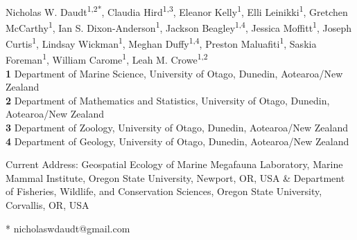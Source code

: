 \documentclass[10pt,letterpaper]{article}
\begin{document}
\vspace*{0.2in}

\begin{flushleft}
{\Large
\textbf{}
}
\newline
\\
Nicholas W. Daudt\textsuperscript{1,2*},
Claudia Hird\textsuperscript{1,3},
Eleanor Kelly\textsuperscript{1},
Elli Leinikki\textsuperscript{1},
Gretchen McCarthy\textsuperscript{1},
Ian S. Dixon-Anderson\textsuperscript{1},
Jackson Beagley\textsuperscript{1,4},
Jessica Moffitt\textsuperscript{1},
Joseph Curtis\textsuperscript{1},
Lindsay Wickman\textsuperscript{1\textcurrency},
Meghan Duffy\textsuperscript{1,4},
Preston Maluafiti\textsuperscript{1},
Saskia Foreman\textsuperscript{1},
William Carome\textsuperscript{1},
Leah M. Crowe\textsuperscript{1,2}
\\
\bigskip
\textbf{1} Department of Marine Science, University of Otago, Dunedin, Aotearoa/New Zealand
\\
\textbf{2} Department of Mathematics and Statistics, University of Otago, Dunedin, Aotearoa/New Zealand
\\
\textbf{3} Department of Zoology, University of Otago, Dunedin, Aotearoa/New Zealand
\\
\textbf{4} Department of Geology, University of Otago, Dunedin, Aotearoa/New Zealand
\\
\bigskip

% 
%


\textcurrency Current Address: Geospatial Ecology of Marine Megafauna Laboratory, Marine Mammal Institute, Oregon State University, Newport, OR, USA \& Department of Fisheries, Wildlife, and Conservation Sciences, Oregon State University, Corvallis, OR, USA

* nicholaswdaudt@gmail.com 

\end{flushleft}
\end{document}
